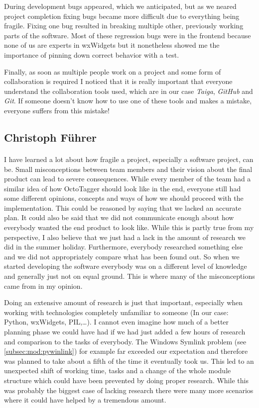 During development bugs appeared, which we anticipated, but as we neared
project completion fixing bugs became more difficult due to everything being
fragile. Fixing one bug resulted in breaking multiple other, previously working
parts of the software. Most of these regression bugs were in the frontend
because none of us are experts in wxWidgets but it nonetheless showed me the
importance of pinning down correct behavior with a test.

Finally, as soon as multiple people work on a project and some form of
collaboration is required I noticed that it is really important that everyone
understand the collaboration tools used, which are in our case \emph{Taiga},
\emph{GitHub} and \emph{Git}. If someone doesn't know how to use one of
these tools and makes a mistake, everyone suffers from this mistake!

\subsection{Christoph Führer}

\paragraph{}
I have learned a lot about how fragile a project, especially a software project,
can be. Small misconceptions between team members and their vision about the
final product can lead to severe consequences. While every member of the
team had a similar idea of how OctoTagger should look like in the end, everyone
still had some different opinions, concepts and ways of how we should proceed with
the implementation. This could be reasoned by saying that we lacked an accurate
plan. It could also be said that we did not communicate enough about how
everybody wanted the end product to look like. While this is partly true from my
perspective, I also believe that we just had a lack in the amount of research we
did in the summer holiday. Furthermore, everybody researched something else and we did
not appropriately compare what has been found out. So when we started developing
the software everybody was on a different level of knowledge and generally just
not on equal ground. This is where many of the misconceptions came from in my
opinion.

Doing an extensive amount of research is just that important, especially when
working with technologies completely unfamiliar to someone (In our case: Python,
wxWidgets, PIL,\ldots). I cannot even imagine how much of a better planning
phase we could have had if we had just added a few hours of research and
comparison to the tasks of everybody. The Windows Symlink problem (see
\cref{subsec:mod:pywinlink}) for example far exceeded our expectation
and therefore was planned to take about a fifth of the time it eventually took
us. This led to an unexpected shift of working time, tasks and a change of the
whole module structure which could have been prevented by doing proper research.
While this was probably the biggest case of lacking research there were many
more scenarios where it could have helped by a tremendous amount.

